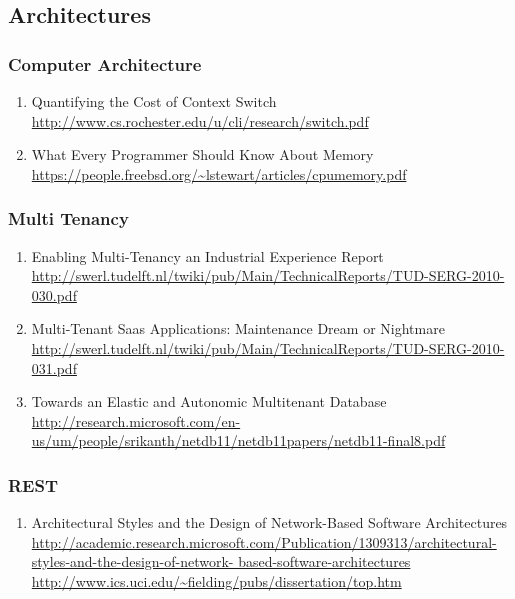 \documentclass{article}
\begin{document}
\subsection{Architectures}

\subsubsection{Computer Architecture}
\begin{enumerate}
	\item {Quantifying the Cost of Context Switch\\
\url{http://www.cs.rochester.edu/u/cli/research/switch.pdf}}
	\item {What Every Programmer Should Know About Memory\\
\url{https://people.freebsd.org/~lstewart/articles/cpumemory.pdf}}
\end{enumerate}

\subsubsection{Multi Tenancy}
\begin{enumerate}
	\item {Enabling Multi-Tenancy an Industrial Experience Report\\
\href{http://swerl.tudelft.nl/twiki/pub/Main/TechnicalReports/TUD-SERG-2010-030.pdf}{http://swerl.tudelft.nl/twiki/pub/Main/TechnicalReports/TUD-SERG-2010-030.pdf}}
	\item {Multi-Tenant Saas Applications: Maintenance Dream or Nightmare\\
\href{http://swerl.tudelft.nl/twiki/pub/Main/TechnicalReports/TUD-SERG-2010-031.pdf}{http://swerl.tudelft.nl/twiki/pub/Main/TechnicalReports/TUD-SERG-2010-031.pdf}}
	\item {Towards an Elastic and Autonomic Multitenant Database\\ \url{http://research.microsoft.com/en-us/um/people/srikanth/netdb11/netdb11papers/netdb11-final8.pdf}}
\end{enumerate}

\subsubsection{REST}
\begin{enumerate}
	\item {Architectural Styles and the Design of Network-Based Software Architectures\\
\href{http://academic.research.microsoft.com/Publication/1309313/architectural-styles-and-the-design-of-network-
	based-software-architectures}{http://academic.research.microsoft.com/Publication/1309313/architectural-styles-and-the-design-of-network-
	based-software-architectures}\\
\url{http://www.ics.uci.edu/~fielding/pubs/dissertation/top.htm}}
\end{enumerate}
\end{document}
